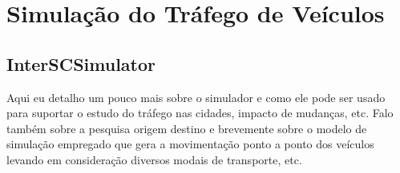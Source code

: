 \section{Simulação do Tráfego de Veículos}

\subsection{InterSCSimulator}
Aqui eu detalho um pouco mais sobre o simulador e como ele pode ser usado para
suportar o estudo do tráfego nas cidades, impacto de mudanças, etc. Falo também
sobre a pesquisa origem destino e brevemente sobre o modelo de simulação empregado
que gera a movimentação ponto a ponto dos veículos levando em consideração diversos
modais de transporte, etc.

\cite{mabs2017}
